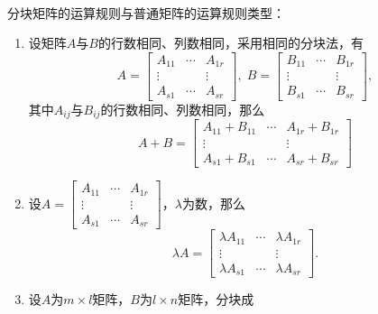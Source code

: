 \paragraph{}
分块矩阵的运算规则与普通矩阵的运算规则类型：
\begin{enumerate}
  \item 设矩阵$A$与$B$的行数相同、列数相同，采用相同的分块法，有
  \begin{equation*}
    A = \left[\begin{array}{ccc}
      A_{11} & \cdots & A_{1r} \\
      \vdots &  & \vdots \\
      A_{s1} & \cdots & A_{sr}
    \end{array}\right], \;
    B = \left[\begin{array}{ccc}
      B_{11} & \cdots & B_{1r} \\
      \vdots &  & \vdots \\
      B_{s1} & \cdots & B_{sr}
    \end{array}\right],
  \end{equation*}
  其中$A_{ij}$与$B_{ij}$的行数相同、列数相同，那么
  \begin{equation*}
    A + B = \left[\begin{array}{ccc}
      A_{11} + B_{11} & \cdots & A_{1r} + B_{1r} \\
      \vdots &  & \vdots \\
      A_{s1} + B_{s1} & \cdots & A_{sr} + B_{sr}
    \end{array}\right]
  \end{equation*}
  \item 设$\displaystyle A=\left[\begin{array}{ccc}
    A_{11} & \cdots & A_{1r} \\
    \vdots &  & \vdots \\
    A_{s1} & \cdots & A_{sr}
  \end{array}\right]$，$\lambda$为数，那么
  \begin{equation*}
    \lambda A = \left[\begin{array}{ccc}
      \lambda A_{11} & \cdots & \lambda A_{1r} \\
      \vdots &  & \vdots \\
      \lambda A_{s1} & \cdots & \lambda A_{sr}
    \end{array}\right].
  \end{equation*}
  \item 设$A$为$m \times l$矩阵，$B$为$l\times n$矩阵，分块成
  \begin{equation*}

\end{equation*}
\end{enumerate}
